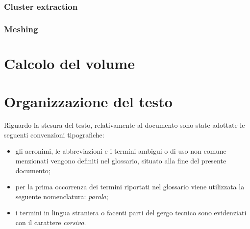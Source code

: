 \subsubsection{Cluster extraction}

\subsubsection{Meshing}

\section{Calcolo del volume}


\section{Organizzazione del testo}
Riguardo la stesura del testo, relativamente al documento sono state adottate le seguenti convenzioni tipografiche:
\begin{itemize}
	\item gli acronimi, le abbreviazioni e i termini ambigui o di uso non comune menzionati vengono definiti nel glossario, situato alla fine del presente documento;
	\item per la prima occorrenza dei termini riportati nel glossario viene utilizzata la seguente nomenclatura: \emph{parola}\glsfirstoccur;
	\item i termini in lingua straniera o facenti parti del gergo tecnico sono evidenziati con il carattere \emph{corsivo}.
\end{itemize}